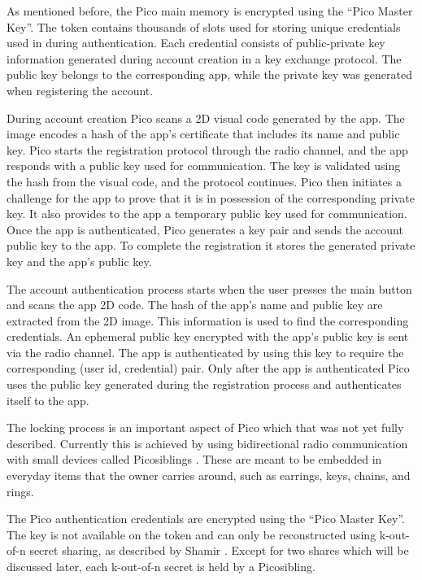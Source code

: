 As mentioned before, the Pico main memory is encrypted using the ``Pico Master Key''. The token contains thousands of slots used for storing unique credentials used in during authentication. Each credential consists of public-private key information generated during account creation in a key exchange protocol. The public key belongs to the corresponding app, while the private key was generated when registering the account. 

During account creation Pico scans a 2D visual code generated by the app. The image encodes a hash of the app's certificate that includes its name and public key. Pico starts the registration protocol through the radio channel, and the app responds with a public key used for communication. The key is validated using the hash from the visual code, and the protocol continues. Pico then initiates a challenge for the app to prove that it is in possession of the corresponding private key. It also provides to the app a temporary public key used for communication. Once the app is authenticated, Pico generates a key pair and sends the account public key to the app. To complete the registration it stores the generated private key and the app's public key.

The account authentication process starts when the user presses the main button and scans the app 2D code. The hash of the app's name and public key are extracted from the 2D image. This information is used to find the corresponding credentials. An ephemeral public key encrypted with the app's public key is sent via the radio channel. The app is authenticated by using this key to require the corresponding (user id, credential) pair. Only after the app is authenticated Pico uses the public key generated during the registration process and authenticates itself to the app.

The locking process is an important aspect of Pico which that was not yet fully described. Currently this is achieved by using bidirectional radio communication with small devices called Picosiblings \cite{stannard2012good}. These are meant to be embedded in everyday items that the owner carries around, such as earrings, keys, chains, and rings.

The Pico authentication credentials are encrypted using the ``Pico Master Key''. The key is not available on the token and can only be reconstructed using k-out-of-n secret sharing, as described by Shamir \cite{shamir1979share}. Except for two shares which will be discussed later, each k-out-of-n secret is held by a Picosibling. 

